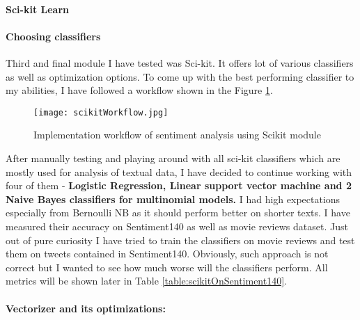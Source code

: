 \paragraph{Sci-kit Learn}\paragraph{Choosing classifiers}
Third and final module I have tested was Sci-kit. It offers lot of various classifiers as well as optimization options. To come up with the best performing classifier to my abilities, I have followed a workflow shown in the Figure \ref{fig:scikitWorkflow}.

\begin{figure}[H]%
    \centering
	\texttt{[image: scikitWorkflow.jpg]}
    \caption{Implementation workflow of sentiment analysis using Scikit module}%
    \label{fig:scikitWorkflow}%
\end{figure}

After manually testing and playing around with all sci-kit classifiers which are mostly used for analysis of textual data, I have decided to continue working with four of them - \textbf{Logistic Regression, Linear support vector machine and 2 Naive Bayes classifiers for multinomial models.} I had high expectations especially from Bernoulli NB as it should perform better on shorter texts. I have measured their accuracy on Sentiment140 as well as movie reviews dataset. Just out of pure curiosity I have tried to train the classifiers on movie reviews and test them on tweets contained in Sentiment140. Obviously, such approach is not correct but I wanted to see how much worse will the classifiers perform. All metrics will be shown later in Table \ref{table:scikitOnSentiment140}.

\paragraph{Vectorizer and its optimizations:}

